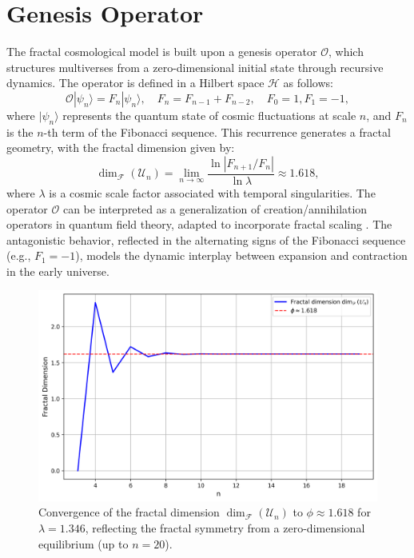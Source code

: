 \documentclass[aps,prl,twocolumn,groupedaddress]{revtex4-2}
\begin{document}
\section{Genesis Operator}
The fractal cosmological model is built upon a genesis operator \(\mathcal{O}\), which structures multiverses from a zero-dimensional initial state through recursive dynamics. The operator is defined in a Hilbert space \(\mathcal{H}\) as follows:
\begin{equation}
\mathcal{O} |\psi_n\rangle = F_n |\psi_n\rangle, \quad F_n = F_{n-1} + F_{n-2}, \quad F_0 = 1, F_1 = -1,
\end{equation}
where \(|\psi_n\rangle\) represents the quantum state of cosmic fluctuations at scale \(n\), and \(F_n\) is the \(n\)-th term of the Fibonacci sequence. This recurrence generates a fractal geometry, with the fractal dimension given by:
\begin{equation}
\dim_{\mathscr{F}}(\mathcal{U}_n) = \lim_{n \to \infty} \frac{\ln |F_{n+1}/F_n|}{\ln \lambda} \approx 1.618,
\end{equation}
where \(\lambda\) is a cosmic scale factor associated with temporal singularities. The operator \(\mathcal{O}\) can be interpreted as a generalization of creation/annihilation operators in quantum field theory, adapted to incorporate fractal scaling \cite{Nottale1993}. The antagonistic behavior, reflected in the alternating signs of the Fibonacci sequence (e.g., \(F_1 = -1\)), models the dynamic interplay between expansion and contraction in the early universe.

\begin{figure}
    \centering
    \includegraphics[width=\columnwidth]{figures/fractal_dimension.png}
    \caption{Convergence of the fractal dimension \(\dim_{\mathscr{F}}(\mathcal{U}_n)\) to \(\phi \approx 1.618\) for \(\lambda = 1.346\), reflecting the fractal symmetry from a zero-dimensional equilibrium (up to \( n = 20 \)).}
    \label{fig:fractal_dimension}
\end{figure}
\end{document}
